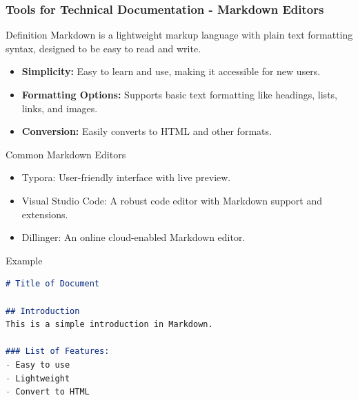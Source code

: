 \documentclass{beamer}
\begin{document}
\begin{frame}[fragile]
    \frametitle{Tools for Technical Documentation - Markdown Editors}
    \begin{block}{Definition}
        Markdown is a lightweight markup language with plain text formatting syntax, designed to be easy to read and write.
    \end{block}

    \begin{itemize}
        \item \textbf{Simplicity:} Easy to learn and use, making it accessible for new users.
        \item \textbf{Formatting Options:} Supports basic text formatting like headings, lists, links, and images.
        \item \textbf{Conversion:} Easily converts to HTML and other formats.
    \end{itemize}

    \begin{block}{Common Markdown Editors}
        \begin{itemize}
            \item Typora: User-friendly interface with live preview.
            \item Visual Studio Code: A robust code editor with Markdown support and extensions.
            \item Dillinger: An online cloud-enabled Markdown editor.
        \end{itemize}
    \end{block}
    
    \begin{block}{Example}
    \begin{lstlisting}[language=Markdown]
# Title of Document

## Introduction
This is a simple introduction in Markdown.

### List of Features:
- Easy to use
- Lightweight
- Convert to HTML
    \end{lstlisting}
    \end{block}
\end{frame}
\end{document}

